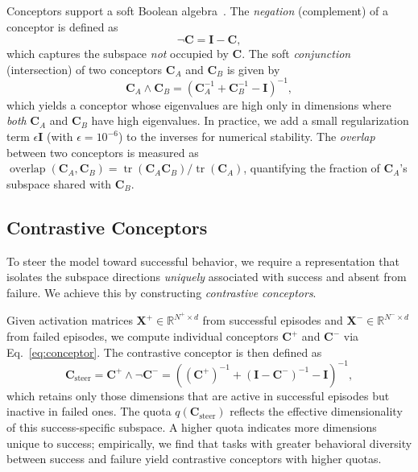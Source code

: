 Conceptors support a soft Boolean algebra~\citep{jaeger2014controlling}. The \emph{negation} (complement) of a conceptor is defined as
\begin{equation}
    \lnot \mathbf{C} = \mathbf{I} - \mathbf{C},
    \label{eq:not}
\end{equation}
which captures the subspace \emph{not} occupied by $\mathbf{C}$. The soft \emph{conjunction} (intersection) of two conceptors $\mathbf{C}_A$ and $\mathbf{C}_B$ is given by
\begin{equation}
    \mathbf{C}_A \wedge \mathbf{C}_B = \left( \mathbf{C}_A^{-1} + \mathbf{C}_B^{-1} - \mathbf{I} \right)^{-1},
    \label{eq:and}
\end{equation}
which yields a conceptor whose eigenvalues are high only in dimensions where \emph{both} $\mathbf{C}_A$ and $\mathbf{C}_B$ have high eigenvalues. In practice, we add a small regularization term $\epsilon \mathbf{I}$ (with $\epsilon = 10^{-6}$) to the inverses for numerical stability. The \emph{overlap} between two conceptors is measured as $\operatorname{overlap}(\mathbf{C}_A, \mathbf{C}_B) = \operatorname{tr}(\mathbf{C}_A \mathbf{C}_B) / \operatorname{tr}(\mathbf{C}_A)$, quantifying the fraction of $\mathbf{C}_A$'s subspace shared with $\mathbf{C}_B$.


\subsection{Contrastive Conceptors}
\label{sec:contrastive}

To steer the model toward successful behavior, we require a representation that isolates the subspace directions \emph{uniquely} associated with success and absent from failure. We achieve this by constructing \emph{contrastive conceptors}.

Given activation matrices $\mathbf{X}^{+} \in \mathbb{R}^{N^{+} \times d}$ from successful episodes and $\mathbf{X}^{-} \in \mathbb{R}^{N^{-} \times d}$ from failed episodes, we compute individual conceptors $\mathbf{C}^{+}$ and $\mathbf{C}^{-}$ via Eq.~\eqref{eq:conceptor}. The contrastive conceptor is then defined as
\begin{equation}
    \mathbf{C}_{\text{steer}} = \mathbf{C}^{+} \wedge \lnot \mathbf{C}^{-} = \left( (\mathbf{C}^{+})^{-1} + (\mathbf{I} - \mathbf{C}^{-})^{-1} - \mathbf{I} \right)^{-1},
    \label{eq:contrastive}
\end{equation}
which retains only those dimensions that are active in successful episodes but inactive in failed ones. The quota $q(\mathbf{C}_{\text{steer}})$ reflects the effective dimensionality of this success-specific subspace. A higher quota indicates more dimensions unique to success; empirically, we find that tasks with greater behavioral diversity between success and failure yield contrastive conceptors with higher quotas.

